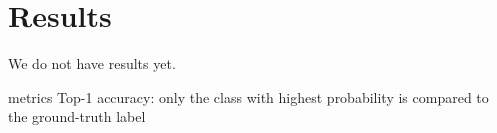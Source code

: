 \section{Results}

We do not have results yet.


metrics
Top-1 accuracy: only the class with highest probability is compared to the ground-truth label